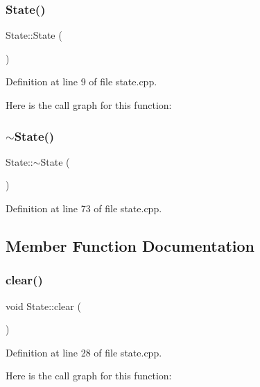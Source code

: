 \subsubsection{\texorpdfstring{State()}{State()}}
{\footnotesize\ttfamily State\+::\+State (\begin{DoxyParamCaption}{ }\end{DoxyParamCaption})}



Definition at line 9 of file state.\+cpp.

Here is the call graph for this function\+:
\mbox{\label{class_state_afab438d92b90dc18d194dbd9c9c8bab3}} 
\subsubsection{\texorpdfstring{$\sim$\+State()}{~State()}}
{\footnotesize\ttfamily State\+::$\sim$\+State (\begin{DoxyParamCaption}{ }\end{DoxyParamCaption})}



Definition at line 73 of file state.\+cpp.



\subsection{Member Function Documentation}
\mbox{\label{class_state_aed3bf8334ee32e0cccba11fc2dc42b68}} 
\subsubsection{\texorpdfstring{clear()}{clear()}}
{\footnotesize\ttfamily void State\+::clear (\begin{DoxyParamCaption}{ }\end{DoxyParamCaption})}



Definition at line 28 of file state.\+cpp.

Here is the call graph for this function\+:
\mbox{\label{class_state_adcabc610335b5bd9efdf7f908de7dacb}} 
